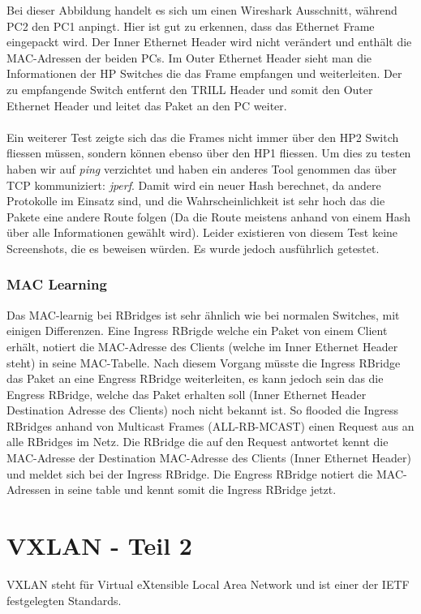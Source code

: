 \documentclass[a4,12pt]{scrartcl}
\begin{document}
\noindent Bei dieser Abbildung handelt es sich um einen Wireshark Ausschnitt, während PC2 den PC1 anpingt. Hier ist gut zu erkennen, dass das Ethernet Frame eingepackt wird. Der Inner Ethernet Header wird nicht verändert und enthält die MAC-Adressen der beiden PCs. Im Outer Ethernet Header sieht man die Informationen der HP Switches die das Frame empfangen und weiterleiten. Der zu empfangende Switch entfernt den TRILL Header und somit den Outer Ethernet Header und leitet das Paket an den PC weiter. \\\\
Ein weiterer Test zeigte sich das die Frames nicht immer über den HP2 Switch fliessen müssen, sondern können ebenso über den HP1 fliessen.  Um dies zu testen haben wir auf \textit{ping} verzichtet und haben ein anderes Tool genommen das über TCP kommuniziert: \textit{jperf}. Damit wird ein neuer Hash berechnet, da andere Protokolle im Einsatz sind, und die Wahrscheinlichkeit ist sehr hoch das die Pakete eine andere Route folgen (Da die Route meistens anhand von einem Hash über alle Informationen gewählt wird). Leider existieren von diesem Test keine Screenshots, die es beweisen würden. Es wurde jedoch ausführlich getestet.  
\newpage

\subsubsection{MAC Learning} 
Das MAC-learnig bei RBridges ist sehr ähnlich wie bei normalen Switches, mit einigen Differenzen. Eine Ingress RBrigde welche ein Paket von einem Client erhält, notiert die MAC-Adresse des Clients (welche im Inner Ethernet Header steht) in seine MAC-Tabelle. Nach diesem Vorgang müsste die Ingress RBridge das Paket an eine Engress RBridge weiterleiten, es kann jedoch sein das die Engress RBridge, welche das Paket erhalten soll (Inner Ethernet Header Destination Adresse des Clients) noch nicht bekannt ist. So flooded die Ingress RBridges anhand von Multicast Frames (ALL-RB-MCAST) einen Request aus an alle RBridges im Netz. Die RBridge die auf den Request antwortet kennt die MAC-Adresse der Destination MAC-Adresse des Clients (Inner Ethernet Header) und meldet sich bei der Ingress RBridge. Die Engress RBridge notiert die MAC-Adressen in seine table und kennt somit die Ingress RBridge jetzt. 

\newpage
\section{VXLAN - Teil 2}
VXLAN steht für Virtual eXtensible Local Area Network und ist einer der IETF festgelegten Standards. 
\end{document}
